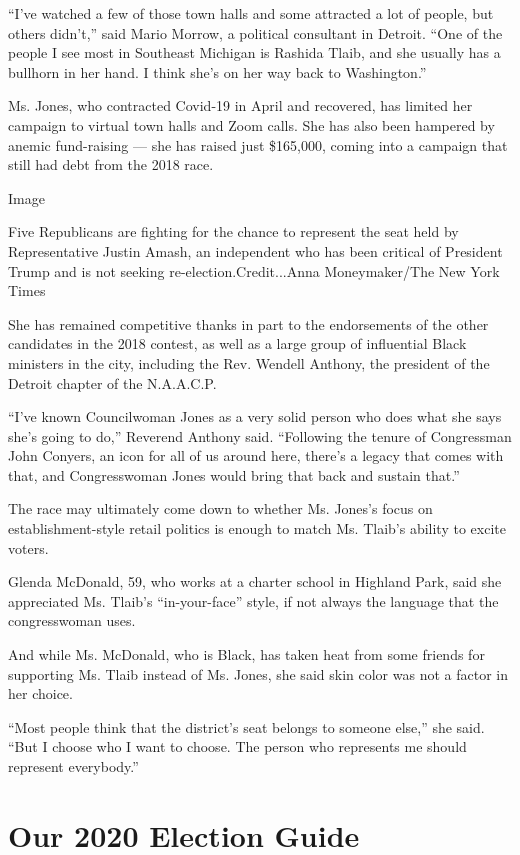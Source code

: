 ``I've watched a few of those town halls and some attracted a lot of
people, but others didn't,'' said Mario Morrow, a political consultant
in Detroit. ``One of the people I see most in Southeast Michigan is
Rashida Tlaib, and she usually has a bullhorn in her hand. I think she's
on her way back to Washington.''

Ms. Jones, who contracted Covid-19 in April and recovered, has limited
her campaign to virtual town halls and Zoom calls. She has also been
hampered by anemic fund-raising --- she has raised just \$165,000,
coming into a campaign that still had debt from the 2018 race.

Image

Five Republicans are fighting for the chance to represent the seat held
by Representative Justin Amash, an independent who has been critical of
President Trump and is not seeking re-election.Credit...Anna
Moneymaker/The New York Times

She has remained competitive thanks in part to the endorsements of the
other candidates in the 2018 contest, as well as a large group of
influential Black ministers in the city, including the Rev. Wendell
Anthony, the president of the Detroit chapter of the N.A.A.C.P.

``I've known Councilwoman Jones as a very solid person who does what she
says she's going to do,'' Reverend Anthony said. ``Following the tenure
of Congressman John Conyers, an icon for all of us around here, there's
a legacy that comes with that, and Congresswoman Jones would bring that
back and sustain that.''

The race may ultimately come down to whether Ms. Jones's focus on
establishment-style retail politics is enough to match Ms. Tlaib's
ability to excite voters.

Glenda McDonald, 59, who works at a charter school in Highland Park,
said she appreciated Ms. Tlaib's ``in-your-face'' style, if not always
the language that the congresswoman uses.

And while Ms. McDonald, who is Black, has taken heat from some friends
for supporting Ms. Tlaib instead of Ms. Jones, she said skin color was
not a factor in her choice.

``Most people think that the district's seat belongs to someone else,''
she said. ``But I choose who I want to choose. The person who represents
me should represent everybody.''

\hypertarget{our-2020-election-guide}{%
\section{Our 2020 Election Guide}\label{our-2020-election-guide}}


